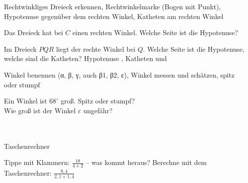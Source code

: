 \setcounter{aufgabe}{0}

\begin{aufgabe}{Rechtwinkliges Dreieck erkennen, Rechtwinkelmarke (Bogen mit Punkt), Hypotenuse gegenüber dem rechten Winkel, Katheten am rechten Winkel}
\begin{teile}
\teil Das Dreieck hat bei $C$ einen rechten Winkel. Welche Seite ist die Hypotenuse?

\leerfeld
\teil Im Dreieck $PQR$ liegt der rechte Winkel bei $Q$. Welche Seite ist die Hypotenuse, welche sind die Katheten? Hypotenuse \leerfeld , Katheten \leerfeld und \leerfeld
\end{teile}
\end{aufgabe}

\begin{aufgabe}{Winkel benennen (α, β, γ, auch β1, β2, ε), Winkel messen und schätzen, spitz oder stumpf}
\begin{teile}
\teil Ein Winkel ist $68^\circ$ groß. Spitz oder stumpf? \\  
\teil Wie groß ist der Winkel $\varepsilon$ ungefähr? \\  \\  \\ 

\end{teile}
\end{aufgabe}

\begin{aufgabe}{Taschenrechner}
\begin{teile}
\teil Tippe mit Klammern: $\frac{18}{4 + 2}$ – was kommt heraus? \leerfeld
\teil Berechne mit dem Taschenrechner: $\frac{8{,}4}{2{,}1 + 1{,}4}$ \leerfeld
\end{teile}
\end{aufgabe}

